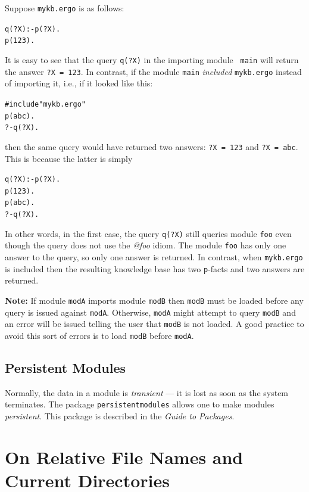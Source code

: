 \documentclass[11pt]{article}
\newcommand{\ERGO}{\mbox{\smaller{\ensuremath{\cal{E}}\smaller{{\sc{RGO}}}}}\xspace}
\newcommand{\FLSYSTEM}{\ERGO}
\newcommand{\ergoext}{ergo\xspace}
\begin{document}
Suppose {\tt mykb.\ergoext} is as follows:
\begin{alltt}
  q(?X) :- p(?X).
  p(123).
\end{alltt}
It is easy to see that the query {\tt q(?X)} in the importing module {\tt
  main} will return the answer {\tt ?X = 123}. In contrast, if the module
{\tt main} \emph{included} {\tt mykb.\ergoext} instead of importing it, i.e.,
if it looked like this:
\begin{alltt}
  #include "mykb.\ergoext"
  p(abc).
  ?- q(?X).
\end{alltt}
then the same query would have returned two answers: {\tt ?X = 123} and 
{\tt ?X = abc}. This is because the latter is simply
\begin{alltt}
  q(?X) :- p(?X).
  p(123).
  p(abc).
  ?- q(?X).
\end{alltt}
In other words, in the first case, the query {\tt q(?X)} still queries
module {\tt foo} even though the query does not use the \emph{@foo}    
idiom. The module {\tt foo} has only one answer to the query, so only one
answer is returned. In contrast, when {\tt mykb.\ergoext} is included then
the resulting knowledge base has two {\tt p}-facts and two answers are returned. 

\textbf{Note:} If module \texttt{modA} imports module \texttt{modB}
then \texttt{modB} must be loaded before
any query is issued against \texttt{modA}. Otherwise, \texttt{modA} might
attempt to query \texttt{modB} and an error will be issued telling the user
that \texttt{modB} is not loaded. A good practice to avoid this sort of
errors is to load \texttt{modB} before \texttt{modA}.

\subsection{Persistent Modules}\label{sec-persist-storage}

Normally, the data
in a \FLSYSTEM module is
{\em transient} --- it is lost as soon as the system terminates.
The \FLSYSTEM package {\tt persistentmodules}  allows one to make
\FLSYSTEM modules \emph{persistent}. This package is described in
the \emph{Guide to \FLSYSTEM Packages}.





\section{On Relative File Names and Current Directories}
\end{document}
